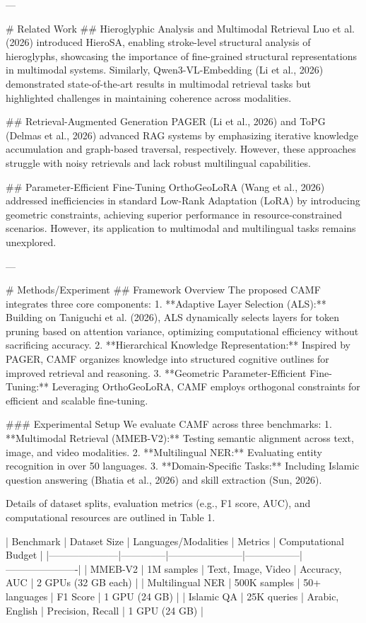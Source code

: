 ---

# Related Work
## Hieroglyphic Analysis and Multimodal Retrieval
Luo et al. (2026) introduced HieroSA, enabling stroke-level structural analysis of hieroglyphs, showcasing the importance of fine-grained structural representations in multimodal systems. Similarly, Qwen3-VL-Embedding (Li et al., 2026) demonstrated state-of-the-art results in multimodal retrieval tasks but highlighted challenges in maintaining coherence across modalities.

## Retrieval-Augmented Generation
PAGER (Li et al., 2026) and ToPG (Delmas et al., 2026) advanced RAG systems by emphasizing iterative knowledge accumulation and graph-based traversal, respectively. However, these approaches struggle with noisy retrievals and lack robust multilingual capabilities.

## Parameter-Efficient Fine-Tuning
OrthoGeoLoRA (Wang et al., 2026) addressed inefficiencies in standard Low-Rank Adaptation (LoRA) by introducing geometric constraints, achieving superior performance in resource-constrained scenarios. However, its application to multimodal and multilingual tasks remains unexplored.

---

# Methods/Experiment
## Framework Overview
The proposed CAMF integrates three core components:
1. **Adaptive Layer Selection (ALS):** Building on Taniguchi et al. (2026), ALS dynamically selects layers for token pruning based on attention variance, optimizing computational efficiency without sacrificing accuracy.
2. **Hierarchical Knowledge Representation:** Inspired by PAGER, CAMF organizes knowledge into structured cognitive outlines for improved retrieval and reasoning.
3. **Geometric Parameter-Efficient Fine-Tuning:** Leveraging OrthoGeoLoRA, CAMF employs orthogonal constraints for efficient and scalable fine-tuning.

### Experimental Setup
We evaluate CAMF across three benchmarks:
1. **Multimodal Retrieval (MMEB-V2):** Testing semantic alignment across text, image, and video modalities.
2. **Multilingual NER:** Evaluating entity recognition in over 50 languages.
3. **Domain-Specific Tasks:** Including Islamic question answering (Bhatia et al., 2026) and skill extraction (Sun, 2026).

Details of dataset splits, evaluation metrics (e.g., F1 score, AUC), and computational resources are outlined in Table 1.

| Benchmark          | Dataset Size | Languages/Modalities | Metrics         | Computational Budget |
|---------------------|--------------|-----------------------|-----------------|----------------------|
| MMEB-V2            | 1M samples   | Text, Image, Video    | Accuracy, AUC   | 2 GPUs (32 GB each)  |
| Multilingual NER    | 500K samples | 50+ languages         | F1 Score        | 1 GPU (24 GB)        |
| Islamic QA          | 25K queries  | Arabic, English       | Precision, Recall | 1 GPU (24 GB)       |

